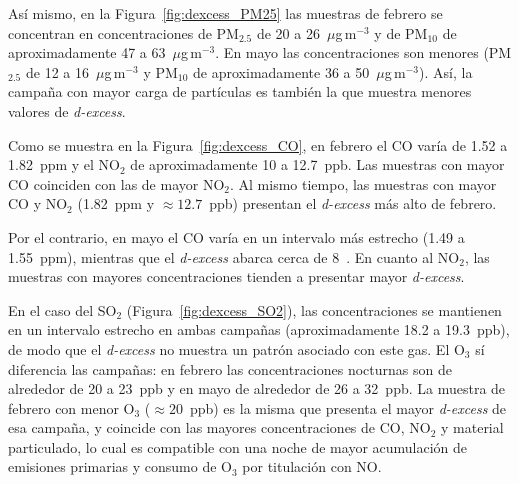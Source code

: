 Así mismo, en la Figura~\ref{fig:dexcess_PM25} las muestras de febrero 
se concentran en concentraciones de PM$_{2.5}$ de 20 a 26~$\mu$g\,m$^{-3}$ y de 
PM$_{10}$ de aproximadamente 47 a 63~$\mu$g\,m$^{-3}$. En mayo las concentraciones
son menores (PM$_{2.5}$ de 12 a 16~$\mu$g\,m$^{-3}$ y PM$_{10}$ de aproximadamente
36 a 50~$\mu$g\,m$^{-3}$). Así, la campaña con mayor carga de partículas es 
también la que muestra menores valores de \textit{d-excess}. 
  
Como se muestra en la Figura~\ref{fig:dexcess_CO}, en febrero el CO varía 
de 1.52 a 1.82~ppm y el NO$_2$ de aproximadamente 10 a 12.7~ppb. Las
muestras con mayor CO coinciden con las de mayor NO$_2$. Al mismo tiempo, las 
muestras con mayor CO y NO$_2$ (1.82~ppm y $\approx 12.7$~ppb) presentan el \textit{d-excess} 
más alto de febrero. 

Por el contrario, en mayo el CO varía en un intervalo más estrecho (1.49 a 1.55~ppm),
mientras que el \textit{d-excess} abarca cerca de 8~\textperthousand. 
En cuanto al NO$_2$, las muestras con mayores concentraciones tienden a
presentar mayor \textit{d-excess}.
 
En el caso del SO$_2$ (Figura~\ref{fig:dexcess_SO2}), las concentraciones
se mantienen en un intervalo estrecho en ambas campañas (aproximadamente 18.2 a 19.3~ppb),
de modo que el \textit{d-excess} no muestra un patrón asociado con este gas. El O$_3$ sí 
diferencia las campañas: en febrero las concentraciones nocturnas son de alrededor 
de 20 a 23~ppb y en mayo de alrededor de 26 a 32~ppb. La muestra de febrero con 
menor O$_3$ ($\approx 20$~ppb) es la misma que presenta el mayor \textit{d-excess} de esa 
campaña, y coincide con las mayores concentraciones de CO, NO$_2$ y material particulado,
lo cual es compatible con una noche de mayor acumulación de emisiones primarias y 
consumo de O$_3$ por titulación con NO.


